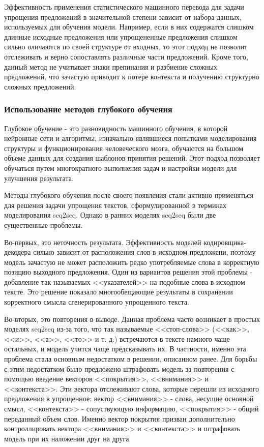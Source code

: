 Эффективность применения статистического машинного перевода для задачи упрощения предложений в значительной степени зависит от набора данных, используемых для обучения модели. Например, если в них содержатся слишком длинные исходные предложения или упрощененные предложения слишком сильно оличаются по своей структуре от входных, то этот подход не позволит отслеживать и верно сопоставлять различные части предложений. Кроме того, данный метод не учитывает знаки препинания и разбиение сложных предложений, что зачастую приводит к потере контекста и получению структурно сложных предложений.


\subsubsection{Использование методов глубокого обучения}

Глубокое обучение - это разновидность машинного обучения, в которой нейронные сети и алгоритмы, изначально являвшиеся попытками моделирования структуры и функционирования человеческого мозга, обучаются на большом объеме данных для создания шаблонов принятия решений. Этот подход позволяет обучаться путем многократного выполнения задач и настройки модели для улучшения результата\cite{deep}.

Методы глубокого обучения после своего появления стали активно применяться для решения задачи упрощения текстов, сформулированной в терминах моделирования seq2seq. Однако в ранних моделях seq2seq были две существенные проблемы.

Во-первых, это неточность результата. Эффективность моделей кодировщика-декодера сильно зависит от расположения слов в исходном предложени, поэтому модель зачастую не может расположить редко употребляемые слова в корректную позицию выходного предложения. Один из вариантов решения этой проблемы -   добавление так называемых <<указателей>> на подобные слова в исходном тексте\cite{nisioi_exploring_2017}. Это решение показало многообещающие результаты в сохранении корректного смысла сгенерированного упрощенного текста.

Во-вторых, это повторения в выводе. Данная проблема часто возникает в простых моделях seq2seq из-за того, что так называемые <<стоп-слова>> (<<как>>, <<и>>, <<а>>, <<то>> и т. д.) встречаются в тексте намного чаще остальных, и модель учится чаще предсказывать их. В частности, именно эта проблема стала основным недостатком в решении, описанном ранее\cite{nisioi_exploring_2017}. Для борьбы с этим недостатком было предложено штрафовать модель за повторения с помощью введение векторов <<покрытия>>, <<внимания>> и <<контекста>>. Эти вектора отслеживают слова, которые перешли из исходного предложения в упрощенное: вектор <<внимания>> - слова, несущие основной смысл, <<контекста>> - сопуствующую информацию, <<покрытия>> - общий переданный объем слов. Именно вектор покрытия призван дополнительно контроллировать вектора  <<внимания>> и <<контекста>> и штрафовать модель при их наложении друг на друга\cite{see_get_2017}.

